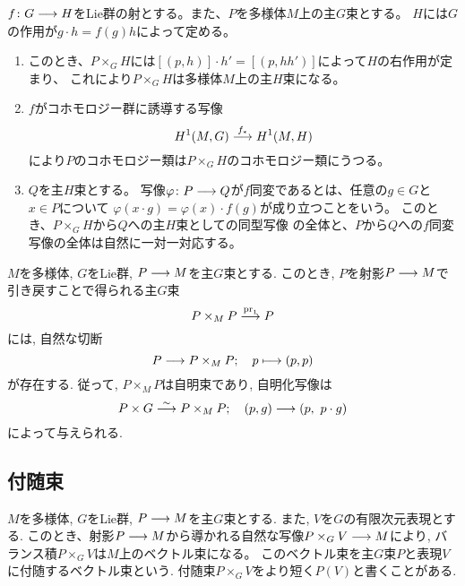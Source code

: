 \begin{thm}
  \label{thm:push-principal-bundle-along-group-hom}
  $f \colon G \longrightarrow H$をLie群の射とする。また、$P$を多様体$M$上の主$G$束とする。
  $H$には$G$の作用が$g\cdot h = f(g)h$によって定める。
  \begin{enumerate}
    \item このとき、$P\times_G H$には$[(p,h)]\cdot h' = [(p,hh')]$によって$H$の右作用が定まり、
    これにより$P\times_G H$は多様体$M$上の主$H$束になる。
    \item $f$がコホモロジー群に誘導する写像
    \begin{equation}
      H^1(M,G)\stackrel{f_*}{\longrightarrow}H^1(M,H)
    \end{equation}
    により$P$のコホモロジー類は$P\times_G H$のコホモロジー類にうつる。
    \item $Q$を主$H$束とする。
    写像$\varphi\colon P\longrightarrow Q$が$f$同変であるとは、任意の$g \in G$と$x \in P$について
    $\varphi(x\cdot g) = \varphi(x)\cdot f(g)$が成り立つことをいう。
    このとき、$P\times_G H$から$Q$への主$H$束としての同型写像
    の全体と、$P$から$Q$への$f$同変写像の全体は自然に一対一対応する。
  \end{enumerate}
\end{thm}

\begin{rem}
\label{rem:principal-bundle-pullback-to-self}
$M$を多様体, $G$をLie群, $P \longrightarrow M$を主$G$束とする.
このとき, $P$を射影$P \longrightarrow M$で引き戻すことで得られる主$G$束
\begin{equation}
P \times_M P \stackrel{\operatorname{pr}_1}{\longrightarrow} P
\end{equation}
には, 自然な切断
\begin{equation}
P \longrightarrow P \times_M P; \quad p \longmapsto (p, p)
\end{equation}
が存在する.
従って, $P \times_M P$は自明束であり, 自明化写像は
\begin{equation}
  P \times G \stackrel{\sim}{\longrightarrow} P \times_M P; \quad (p, g) \longrightarrow (p,\ p \cdot g)
\end{equation}
によって与えられる.
\end{rem}

\subsection{付随束}

\begin{dfn}
$M$を多様体, $G$をLie群, $P \longrightarrow M$を主$G$束とする.
また, $V$を$G$の有限次元表現とする.
このとき、射影$P \longrightarrow M$から導かれる自然な写像$P \times_G V \longrightarrow M$により,
バランス積$P \times_G V$は$M$上のベクトル束になる。
このベクトル束を主$G$束$P$と表現$V$に付随するベクトル束という.
付随束$P \times_G V$をより短く$P(V)$と書くことがある.
\end{dfn}

